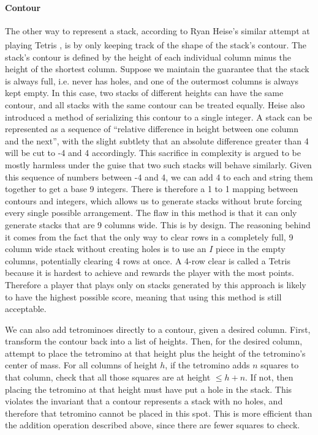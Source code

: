 \documentclass[fontsize=12pt]{article}
\def\tetris{Tetris\textsuperscript{\textregistered}}
\begin{document}
\paragraph{Contour}
\label{par:contour}
The other way to represent a stack, according to Ryan Heise's similar attempt at playing \tetris{} \cite{bib:ryan_heise}, is by only keeping track of the shape of the stack's contour. The stack's contour is defined by the height of each individual column minus the height of the shortest column. Suppose we maintain the guarantee that the stack is always full, i.e. never has holes, and one of the outermost columns is always kept empty. In this case, two stacks of different heights can have the same contour, and all stacks with the same contour can be treated equally. Heise also introduced a method of serializing this contour to a single integer. A stack can be represented as a sequence of ``relative difference in height between one column and the next'', with the slight subtlety that an absolute difference greater than 4 will be cut to -4 and 4 accordingly. This sacrifice in complexity is argued to be mostly harmless under the guise that two such stacks will behave similarly. Given this sequence of numbers between -4 and 4, we can add 4 to each and string them together to get a base 9 integers. There is therefore a 1 to 1 mapping between contours and integers, which allows us to generate stacks without brute forcing every single possible arrangement. The flaw in this method is that it can only generate stacks that are 9 columns wide. This is by design. The reasoning behind it comes from the fact that the only way to clear rows in a completely full, 9 column wide stack without creating holes is to use an $I$ piece in the empty columns, potentially clearing 4 rows at once. A 4-row clear is called a Tetris because it is hardest to achieve and rewards the player with the most points. Therefore a player that plays only on stacks generated by this approach is likely to have the highest possible score, meaning that using this method is still acceptable.
\par We can also add tetrominoes directly to a contour, given a desired column. First, transform the contour back into a list of heights. Then, for the desired column, attempt to place the tetromino at that height plus the height of the tetromino's center of mass. For all columns of height $h$, if the tetromino adds $n$ squares to that column, check that all those squares are at height $\leq h + n$. If not, then placing the tetromino at that height must have put a hole in the stack. This violates the invariant that a contour represents a stack with no holes, and therefore that tetromino cannot be placed in this spot. This is more efficient than the addition operation described above, since there are fewer squares to check.
\end{document}
